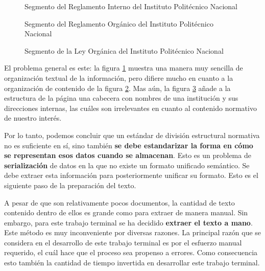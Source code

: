 \begin{figure}[ht]
    \centering
    \caption{Segmento del Reglamento Interno del Instituto Politécnico Nacional}
    \label{fig:ejemplo_1_reglamento_interno}
\end{figure}

\begin{figure}[ht]
    \centering
    \caption{Segmento del Reglamento Orgánico del Instituto Politécnico Nacional}
    \label{fig:ejemplo_2_reglamento_organico}
\end{figure}

\begin{figure}[ht]
    \centering
    \caption{Segmento de la Ley Orgánica del Instituto Politécnico Nacional}
    \label{fig:ejemplo_3_ley_organica}
\end{figure}

El problema general es este: la figura \ref{fig:ejemplo_1_reglamento_interno} muestra una manera muy sencilla de organización textual de la información, pero difiere mucho en cuanto a la organización de contenido de la figura \ref{fig:ejemplo_2_reglamento_organico}. Mas aún, la figura \ref{fig:ejemplo_3_ley_organica} añade a la estructura de la página una cabecera con nombres de una institución y sus direcciones internas, las cuáles son irrelevantes en cuanto al contenido normativo de nuestro interés.
 
Por lo tanto, podemos concluir que un estándar de división estructural normativa no es suficiente en sí, sino también \textbf{se debe estandarizar la forma en cómo se representan esos datos cuando se almacenan}. Esto es un problema de \textbf{serialización} de datos en la que no existe un formato unificado semántico. Se debe extraer esta información para posteriormente unificar su formato. Esto es el siguiente paso de la preparación del texto.

A pesar de que son relativamente pocos documentos, la cantidad de texto contenido dentro de ellos es grande como para extraer de manera manual. Sin embargo, para este trabajo terminal se ha decidido \textbf{extraer el texto a mano}. Este método es muy inconveniente por diversas razones. La principal razón que se considera en el desarrollo de este trabajo terminal es por el esfuerzo manual requerido, el cuál hace que el proceso sea propenso a errores. Como consecuencia esto también la cantidad de tiempo invertida en desarrollar este trabajo terminal.

